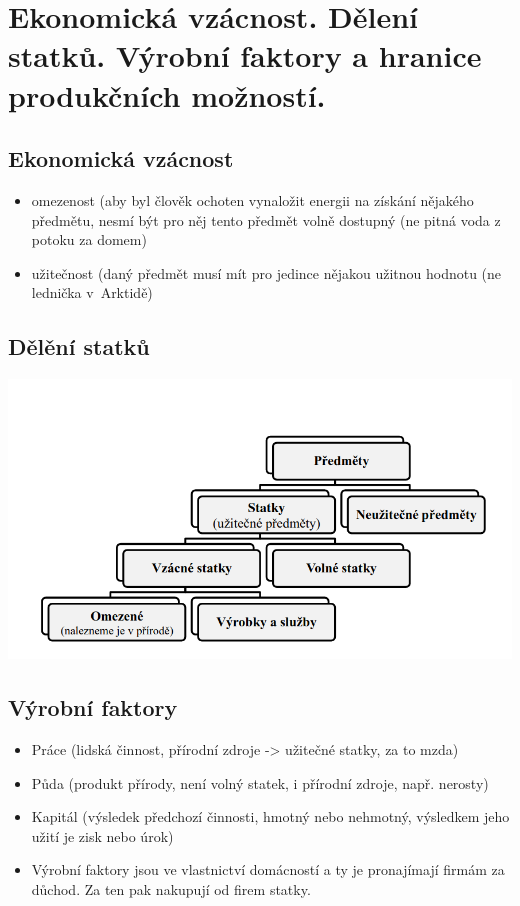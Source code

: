 \clearpage
\section{Ekonomická vzácnost. Dělení statků. Výrobní faktory a hranice produkčních možností.}

\subsection{Ekonomická vzácnost}
\begin{itemize}
    \item omezenost (aby byl člověk ochoten vynaložit energii na získání nějakého předmětu,
    nesmí být pro něj tento předmět volně dostupný (ne pitná voda z potoku za domem)
    \item užitečnost (daný předmět musí mít pro jedince nějakou užitnou hodnotu (ne lednička
    v~Arktidě)
\end{itemize}

\subsection{Dělění statků}
\includegraphics[width=16cm]{images/deleni.png}

\subsection{Výrobní faktory}
\begin{itemize}
    \item Práce (lidská činnost, přírodní zdroje -> užitečné statky, za to mzda)
    \item Půda (produkt přírody, není volný statek, i přírodní zdroje, např. nerosty)
    \item Kapitál (výsledek předchozí činnosti, hmotný nebo nehmotný, výsledkem jeho užití je zisk nebo úrok)
    \item Výrobní faktory jsou ve vlastnictví domácností a ty je pronajímají firmám za důchod. Za ten pak
    nakupují od firem statky.
\end{itemize}

